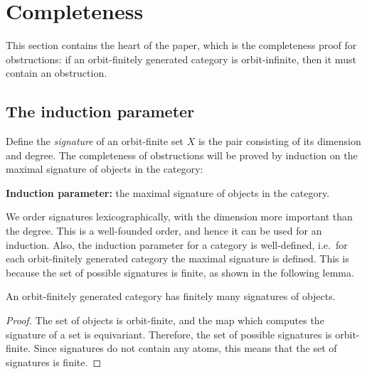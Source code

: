 \section{Completeness}
\label{sec:completeness-of-obstructions}
This section contains the heart of the paper, which is the completeness proof for obstructions: if an orbit-finitely generated category is orbit-infinite, then it must contain an obstruction. 
\subsection{The induction parameter}
\label{sec:induction-parameter}
Define the  \emph{signature} of an orbit-finite set $X$ is the pair consisting of its dimension and degree. The completeness of obstructions will be proved by induction on the maximal signature of objects in the category: 
\begin{center}
    \textbf{Induction parameter:} the maximal signature of objects in the category.
\end{center}

 We order signatures lexicographically, with the dimension more important than the degree. This is a well-founded order, and hence it can be used for an induction.  Also, the induction  parameter for a category  is well-defined, i.e.~for each orbit-finitely generated category the maximal signature is defined. This is because the set 
of possible signatures is finite, as shown in the following lemma.

\begin{lemma}
    An orbit-finitely generated category has finitely many signatures of objects.
\end{lemma}
\begin{proof}
The set of objects is orbit-finite, and the map which computes the signature of a set is equivariant. Therefore, the set of possible signatures is orbit-finite. Since signatures do not contain any atoms, this means that the set of signatures is finite.    
\end{proof}






